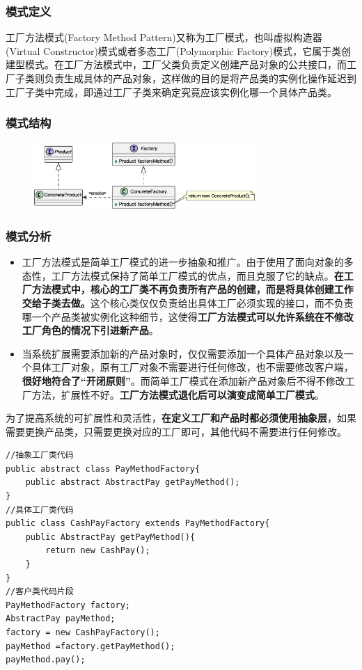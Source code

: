 \subsubsection{模式定义}
工厂方法模式(Factory Method Pattern)又称为工厂模式，也叫虚拟构造器(Virtual Constructor)模式或者多态工厂(Polymorphic Factory)模式，它属于类创建型模式。在工厂方法模式中，工厂父类负责定义创建产品对象的公共接口，而工厂子类则负责生成具体的产品对象，这样做的目的是将产品类的实例化操作延迟到工厂子类中完成，即通过工厂子类来确定究竟应该实例化哪一个具体产品类。

\subsubsection{模式结构}
\begin{figure}[H]
    \vspace{-0.5em}
	\centering
	\includegraphics[width=0.75\textwidth]{images/工厂模式结构.eps}
    \vspace{-1em}
\end{figure}

\subsubsection{模式分析}
\begin{itemize}
    \item 工厂方法模式是简单工厂模式的进一步抽象和推广。由于使用了面向对象的多态性，工厂方法模式保持了简单工厂模式的优点，而且克服了它的缺点。\textbf{在工厂方法模式中，核心的工厂类不再负责所有产品的创建，而是将具体创建工作交给子类去做。}这个核心类仅仅负责给出具体工厂必须实现的接口，而不负责哪一个产品类被实例化这种细节，这使得\textbf{工厂方法模式可以允许系统在不修改工厂角色的情况下引进新产品}。
    \item 当系统扩展需要添加新的产品对象时，仅仅需要添加一个具体产品对象以及一个具体工厂对象，原有工厂对象不需要进行任何修改，也不需要修改客户端，\textbf{很好地符合了“开闭原则”}。而简单工厂模式在添加新产品对象后不得不修改工厂方法，扩展性不好。\textbf{工厂方法模式退化后可以演变成简单工厂模式}。
\end{itemize}

为了提高系统的可扩展性和灵活性，\textbf{在定义工厂和产品时都必须使用抽象层}，如果需要更换产品类，只需要更换对应的工厂即可，其他代码不需要进行任何修改。
\begin{lstlisting}
//抽象工厂类代码
public abstract class PayMethodFactory{
    public abstract AbstractPay getPayMethod();
}
//具体工厂类代码
public class CashPayFactory extends PayMethodFactory{
    public AbstractPay getPayMethod(){
        return new CashPay();
    }
}
//客户类代码片段
PayMethodFactory factory;
AbstractPay payMethod;
factory = new CashPayFactory();
payMethod =factory.getPayMethod();
payMethod.pay();
\end{lstlisting}

